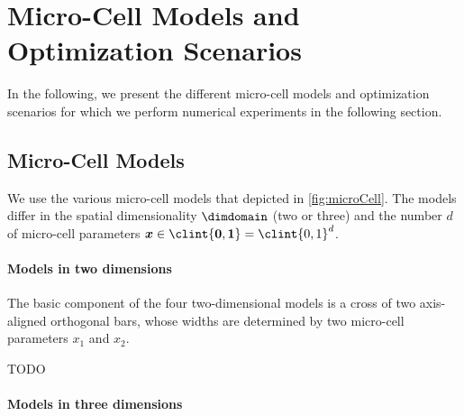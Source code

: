 \section{Micro-Cell Models and Optimization Scenarios}
\label{sec:63models}


\noindent
In the following, we present the different micro-cell models
and optimization scenarios for which we perform numerical
experiments in the following section.



\subsection{Micro-Cell Models}
\label{sec:631models}

We use the various micro-cell models that depicted in \cref{fig:microCell}.
The models differ in the spatial dimensionality $\dimdomain$ (two or three)
and the number $d$ of micro-cell parameters
$\*x \in \clint{\*0, \*1} = \clint{0, 1}^d$.

\paragraph{Models in two dimensions}

The basic component of the four two-dimensional models
is a cross of two axis-aligned orthogonal bars, whose widths
are determined by two micro-cell parameters $x_1$ and $x_2$.

TODO

\paragraph{Models in three dimensions}

\dummytext[3]{}

